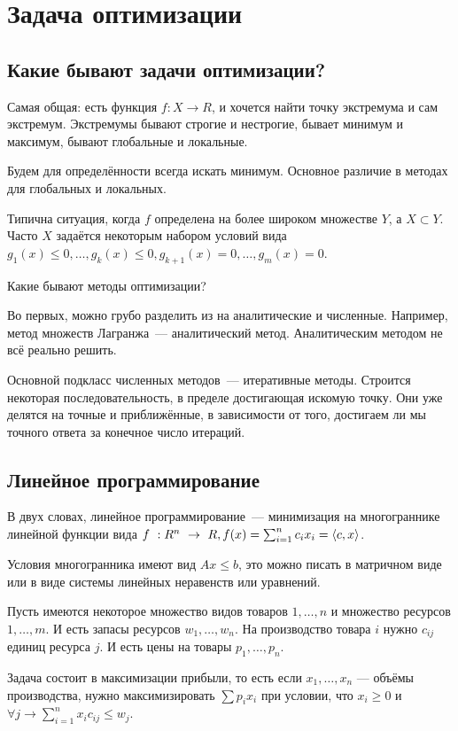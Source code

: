 \section{Задача оптимизации}
\subsection{Какие бывают задачи оптимизации?}

Самая общая: есть функция $f: X \rightarrow R$, и хочется найти точку экстремума и сам экстремум.
Экстремумы бывают строгие и нестрогие, бывает минимум и максимум, бывают глобальные и локальные.

Будем для определённости всегда искать минимум. Основное различие в методах для глобальных и локальных.

Типична ситуация, когда $f$ определена на более широком множестве $Y$, а $X \subset Y$.
Часто $X$ задаётся некоторым набором условий вида
$g_1(x) \le 0, \ldots, g_k(x)\le 0, g_{k+1}(x)=0, \ldots, g_m(x)=0$.

Какие бывают методы оптимизации?

Во первых, можно грубо разделить из на аналитические и численные. Например, метод множеств Лагранжа~--- аналитический метод.
Аналитическим методом не всё реально решить.

Основной подкласс численных методов~--- итеративные методы.
Строится некоторая последовательность, в пределе достигающая искомую точку.
Они уже делятся на точные и приближённые, в зависимости от того, достигаем ли мы точного ответа за конечное число итераций.

\subsection{Линейное программирование}

В двух словах, линейное программирование~--- минимизация на многограннике линейной функции вида
$f~: R^n~\rightarrow~R, f(x) = \sum_{i=1}^n c_ix_i = \braket{c,x}$.

Условия многогранника имеют вид $Ax \le b$, это можно писать в матричном виде или в виде системы линейных неравенств или уравнений.

\begin{example}
  Пусть имеются некоторое множество видов товаров $1,\ldots,n$ и множество ресурсов $1,\ldots,m$.
  И есть запасы ресурсов $w_1,\ldots,w_n$. На производство товара $i$ нужно $c_{ij}$ единиц ресурса $j$.
  И есть цены на товары $p_1,\ldots,p_n$.

  Задача состоит в максимизации прибыли, то есть если $x_1,\ldots,x_n$ --- объёмы производства,
  нужно максимизировать $\sum p_ix_i$ при условии, что $x_i \ge 0$ и $\forall j \to \sum_{i=1}^n x_ic_{ij} \le w_j$.
\end{example}

